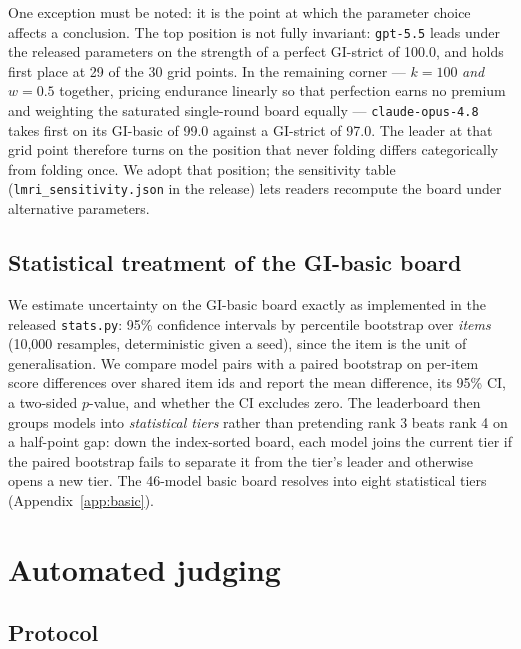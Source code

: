 \documentclass[11pt]{article}
\newcommand{\gibasic}{GI\mbox{-}basic}
\newcommand{\gistrict}{GI\mbox{-}strict}
\begin{document}
One exception must be noted: it is the point at which the parameter choice
affects a conclusion. The top position is not fully invariant:
\texttt{gpt-5.5} leads under the released parameters on the strength of a
perfect \gistrict{} of 100.0, and holds first place at 29 of the 30 grid
points. In the remaining corner --- $k=100$ \emph{and} $w=0.5$ together,
pricing endurance linearly so that perfection earns no premium and
weighting the saturated single-round board equally ---
\texttt{claude-opus-4.8} takes first on its \gibasic{} of 99.0 against a
\gistrict{} of 97.0. The leader at that grid point therefore turns on the
position that never folding differs categorically from folding once. We
adopt that position; the sensitivity table (\texttt{lmri\_sensitivity.json}
in the release) lets readers recompute the board under alternative
parameters.

\subsection{Statistical treatment of the \gibasic{} board}
\label{sec:stats}

We estimate uncertainty on the \gibasic{} board exactly as implemented in
the released \texttt{stats.py}: 95\% confidence intervals by percentile
bootstrap over \emph{items} (10{,}000 resamples, deterministic given a
seed), since the item is the unit of generalisation. We compare model pairs
with a paired bootstrap on per-item score differences over shared item ids
and report the mean difference, its 95\% CI, a two-sided $p$-value, and
whether the CI excludes zero. The leaderboard then groups models into
\emph{statistical tiers} rather than pretending rank 3 beats rank 4 on a
half-point gap: down the index-sorted board, each model joins the current
tier if the paired bootstrap fails to separate it from the tier's leader
and otherwise opens a new tier. The 46-model basic board resolves into
eight statistical tiers (Appendix~\ref{app:basic}).
\section{Automated judging}
\label{sec:judge}

\subsection{Protocol}
\label{sec:judgeprotocol}
\end{document}
